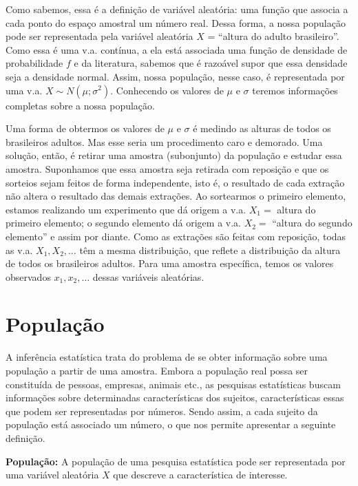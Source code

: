 \documentclass[
]{book}
\begin{document}
Como sabemos, essa é a definição de variável aleatória: uma função que associa a cada ponto do espaço amostral um número real. Dessa forma, a nossa população pode ser representada pela variável aleatória \(X\) = ``altura do adulto brasileiro''. Como essa é uma v.a. contínua, a ela está associada uma função de densidade de probabilidade \(f\) e da literatura, sabemos que é razoável supor que essa densidade seja a densidade normal. Assim, nossa população, nesse caso, é representada por uma v.a. \(X\sim N(\mu; \sigma^2)\). Conhecendo os valores de \(\mu\) e \(\sigma\) teremos informações completas sobre a nossa população.

Uma forma de obtermos os valores de \(\mu\) e \(\sigma\) é medindo as alturas de todos os brasileiros adultos. Mas esse seria um procedimento caro e demorado. Uma solução, então, é retirar uma amostra (subonjunto) da população e estudar essa amostra. Suponhamos que essa amostra seja retirada com reposição e que os sorteios sejam feitos de forma independente, isto é, o resultado de cada extração não altera o resultado das demais extrações. Ao sortearmos o primeiro elemento, estamos realizando um experimento que dá origem a v.a. \(X_1=\) altura do primeiro elemento; o segundo elemento dá origem a v.a. \(X_2=\) ``altura do segundo elemento'' e assim por diante. Como as extrações são feitas com reposição, todas as v.a. \(X_1, X_2, \ldots\) têm a mesma distribuição, que reflete a distribuição da altura de todos os brasileiros adultos. Para uma amostra específica, temos os valores observados \(x_1, x_2, \ldots\) dessas variáveis aleatórias.

\hypertarget{populauxe7uxe3o}{%
\section{População}\label{populauxe7uxe3o}}

A inferência estatística trata do problema de se obter informação sobre uma população a partir de uma amostra. Embora a população real possa ser constituída de pessoas, empresas, animais etc., as pesquisas estatísticas buscam informações sobre determinadas características dos sujeitos, características essas que podem ser representadas por números. Sendo assim, a cada sujeito da população está associado um número, o que nos permite apresentar a seguinte definição.

\textbf{População:} A população de uma pesquisa estatística pode ser representada por uma variável aleatória \(X\) que descreve a característica de interesse.
\end{document}
